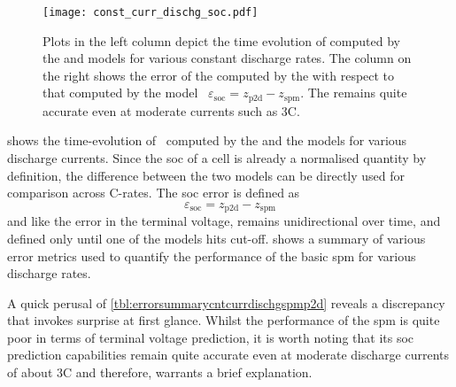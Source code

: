 \begin{figure}[!htb]
    \centering
    \texttt{[image: const\_curr\_dischg\_soc.pdf]}
    \caption[ computed by  and
     models for constant current discharge]{Plots in the left
        column depict the time evolution of  computed by the
         and  models for various constant
        discharge rates. The column on the right shows the error of the
         computed by the  with respect to that
        computed by the  model \ie~$ \varepsilon_\text{soc}
        = {z_\text{p2d}} - z_\text{spm} $. The  remains quite
    accurate even at moderate currents such as 3C.}
    \label{fig:cnstdischgspmp2dsoc}
\end{figure}

  shows  the  time-evolution  of~
computed by the   and the   models for various
discharge  currents. Since  the  \gls{soc} of  a cell  is  already a  normalised
quantity by  definition, the difference between  the two models can  be directly
used for comparison across C-rates. The \gls{soc} error is defined as
\begin{equation}
    \varepsilon_\text{soc} = {z_\text{p2d}} - z_\text{spm}
\end{equation}
and   like  the   error  in   the  terminal   voltage,  remains   unidirectional
over  time,   and  defined  only   until  one   of  the  models   hits  cut-off.
  shows  a  summary of  various  error
metrics used  to quantify  the performance  of the  basic \gls{spm}  for various
discharge rates.



A   quick   perusal  of \cref{tbl:errorsummarycntcurrdischgspmp2d}   reveals   a
discrepancy that invokes surprise at first glance. Whilst the performance of the
\gls{spm} is  quite poor in  terms of terminal  voltage prediction, it  is worth
noting that its \gls{soc} prediction  capabilities remain quite accurate even at
moderate  discharge  currents  of  about  3C and  therefore,  warrants  a  brief
explanation.

